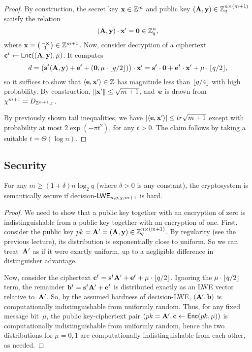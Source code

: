 \documentclass[11pt]{article}
\begin{document}
\begin{proof}
  By construction, the secret key $\vecx \in \Z^{m}$ and public key
  $(\matA,\vecy) \in \Zq^{n \times (m+1)}$ satisfy the relation
  \[ (\matA, \vecy) \cdot \vecx' = \veczero \in \Zq^{n} ,
  \]
  where $\vecx = \smlmat{-\vecx \\ 1} \in \Z^{m+1}$. Now, consider
  decryption of a ciphertext
  $\vecc^{t} \gets \pkcenc((\matA, \vecy), \mu)$. It computes
  \[ d = \parens*{\vecs^{t} (\matA, \vecy) + \vece^{t} + (\veczero,\mu
      \cdot \floor{q/2})} \cdot \vecx' = \vecs^{t} \cdot \veczero +
    \vece^{t} \cdot \vecx' + \mu \cdot \floor{q/2} ,
  \]
  so it suffices to show that $\inner{\vece,\vecx'} \in \Z$ has
  magnitude less than $\floor{q/4}$ with high probability. By
  construction, $\length{\vecx'} \leq \sqrt{m+1}$, and~$\vece$ is
  drawn from $\chi^{m+1} = D_{\Z^{m+1},r}$.

  By previously shown tail inequalities, we have
  $\abs{\inner{\vece,\vecx'}} \leq t r \sqrt{m+1}$ except with
  probability at most $2\exp(-\pi t^{2})$, for any $t > 0$. The claim
  follows by taking a suitable $t = \Theta(\log n)$.
\end{proof}

\subsection{Security}
\label{sec:security}

\begin{lemma}
  \label{lem:security}
  For any $m \geq (1+\delta) n \log_{2} q$ (where $\delta > 0$ is any
  constant), the cryptosystem is semantically secure if
  decision-$\lwe_{n,q,\chi,m+1}$ is hard.
\end{lemma}

\begin{proof}
  We need to show that a public key together with an encryption of
  zero is indistinguishable from a public key together with an
  encryption of one. First, consider the public key
  $pk = \matA' = (\matA, \vecy) \in \Zq^{n \times (m+1)}$. By
  regularity (see the previous lecture), its distribution is
  exponentially close to uniform. So we can treat~$\matA'$ as if it
  were exactly uniform, up to a negligible difference in distinguisher
  advantage.

  Now, consider the ciphertext
  $\vecc^{t} = \vecs^t\matA' + \vece^t + \mu \cdot \floor{q/2}$.
  Ignoring the $\mu \cdot \floor{q/2}$ term, the remainder
  $\vecb^{t} = \vecs^t\matA' + \vece^t$ is distributed exactly as an
  LWE vector relative to~$\matA'$. So, by the assumed hardness of
  decision-LWE, $(\matA', \vecb)$ is computationally indistinguishable
  from uniformly random. Thus, for any fixed message bit~$\mu$, the
  public key-ciphertext pair
  $(pk = \matA', \vecc \gets \pkcenc(pk,\mu))$ is computationally
  indistinguishable from uniformly random, hence the two distributions
  for $\mu=0,1$ are computationally indistinguishable from each other,
  as needed.
\end{proof}



\end{document}

